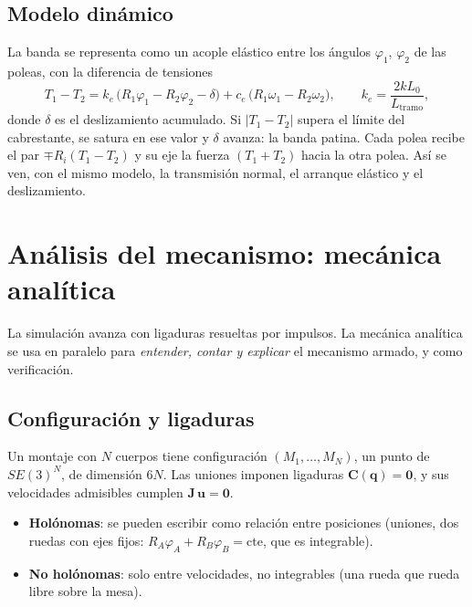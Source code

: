 \documentclass[11pt,a4paper]{article}
\numberwithin{equation}{section}
\newcommand{\vect}[1]{\bm{#1}}
\begin{document}
\subsection{Modelo dinámico}
La banda se representa como un acople elástico entre los ángulos $\varphi_1$, $\varphi_2$ de las poleas, con la
diferencia de tensiones
\begin{equation}
  T_1 - T_2 = k_e\,\bigl(R_1\varphi_1 - R_2\varphi_2 - \delta\bigr) + c_e\,\bigl(R_1\omega_1 - R_2\omega_2\bigr),
  \qquad k_e = \frac{2k L_0}{L_{\text{tramo}}},
\end{equation}
donde $\delta$ es el deslizamiento acumulado. Si $\lvert T_1 - T_2\rvert$ supera el límite del cabrestante, se satura en
ese valor y $\delta$ avanza: la banda patina. Cada polea recibe el par $\mp R_i(T_1 - T_2)$ y su eje la fuerza
$(T_1 + T_2)$ hacia la otra polea. Así se ven, con el mismo modelo, la transmisión normal, el arranque elástico y el
deslizamiento.

\section{Análisis del mecanismo: mecánica analítica}\label{sec:analitica}

La simulación avanza con ligaduras resueltas por impulsos. La mecánica analítica se usa en paralelo para
\emph{entender, contar y explicar} el mecanismo armado, y como verificación.

\subsection{Configuración y ligaduras}
Un montaje con $N$ cuerpos tiene configuración $(M_1,\dots,M_N)$, un punto de $SE(3)^N$, de dimensión $6N$. Las
uniones imponen ligaduras $\vect{C}(\vect{q}) = \vect{0}$, y sus velocidades admisibles cumplen
$\mathbf{J}\,\vect{u} = \vect{0}$.
\begin{itemize}[leftmargin=*]
  \item \textbf{Holónomas}: se pueden escribir como relación entre posiciones (uniones, dos ruedas con ejes fijos:
        $R_A\varphi_A + R_B\varphi_B = \text{cte}$, que es integrable).
  \item \textbf{No holónomas}: solo entre velocidades, no integrables (una rueda que rueda libre sobre la mesa).
\end{itemize}
\end{document}
